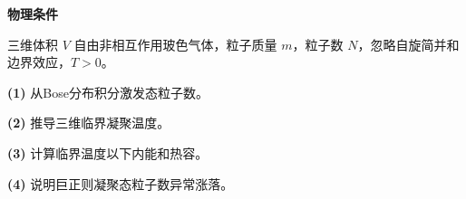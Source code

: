 \textbf{物理条件}\par 三维体积 \(V\) 自由非相互作用玻色气体，粒子质量 \(m\)，粒子数 \(N\)，忽略自旋简并和边界效应，\(T>0\)。
\par\noindent\textbf{(1)} 从Bose分布积分激发态粒子数。
\par\noindent\textbf{(2)} 推导三维临界凝聚温度。
\par\noindent\textbf{(3)} 计算临界温度以下内能和热容。
\par\noindent\textbf{(4)} 说明巨正则凝聚态粒子数异常涨落。
